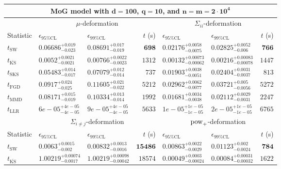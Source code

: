 \begin{tabular}{l|llr|llr}
	\toprule
	\multicolumn{7}{c}{{\bf MoG model with $\mathbf{d=100}$, $\mathbf{q=10}$, and $\mathbf{n=m=2\cdot 10^{4}}$}} \\
	\toprule
	\multicolumn{1}{c}{} & \multicolumn{3}{c}{$\mu$-deformation} & \multicolumn{3}{c}{$\Sigma_{ii}$-deformation} \\
	Statistic & $\epsilon_{95\%\mathrm{CL}}$ & $\epsilon_{99\%\mathrm{CL}}$ & $t$ (s) & $\epsilon_{95\%\mathrm{CL}}$ & $\epsilon_{99\%\mathrm{CL}}$ & $t$ (s) \\
	\midrule
	$t_{\mathrm{SW}}$ & $0.06686_{-0.023}^{+0.019}$ & $0.08691_{-0.019}^{+0.017}$ & ${\mathbf{698}}$ & $0.02176_{-0.0075}^{+0.0058}$ & $0.02825_{-0.006}^{+0.0052}$ & ${\mathbf{766}}$ \\
	$t_{\overline{\mathrm{KS}}}$ & ${\mathbf{0.0052_{-0.0021}^{+0.0021}}}$ & ${\mathbf{0.00766_{-0.0023}^{+0.0022}}}$ & $1312$ & ${\mathbf{0.00132_{-0.00062}^{+0.00073}}}$ & ${\mathbf{0.00216_{-0.00078}^{+0.00083}}}$ & $1447$ \\
	$t_{\mathrm{SKS}}$ & $0.05483_{-0.017}^{+0.014}$ & $0.07079_{-0.014}^{+0.012}$ & $737$ & $0.01903_{-0.0051}^{+0.0038}$ & $0.02404_{-0.0037}^{+0.0031}$ & $813$ \\
	$t_{\mathrm{FGD}}$ & $0.0917_{-0.025}^{+0.024}$ & $0.11605_{-0.022}^{+0.021}$ & $5212$ & $0.02962_{-0.0077}^{+0.0062}$ & $0.03721_{-0.0056}^{+0.005}$ & $5272$ \\
	$t_{\mathrm{MMD}}$ & $0.08171_{-0.019}^{+0.015}$ & $0.10334_{-0.014}^{+0.013}$ & $1992$ & $0.01681_{-0.0038}^{+0.0034}$ & $0.02112_{-0.0031}^{+0.0029}$ & $2247$ \\
	$t_{\mathrm{LLR}}$ & $6e-05_{-4e-05}^{+4e-05}$ & $9e-05_{-4e-05}^{+4e-05}$ & $5633$ & $1e-05_{-1e-05}^{+1e-05}$ & $2e-05_{-1e-05}^{+1e-05}$ & $6765$ \\
	\toprule
	\multicolumn{1}{c}{} & \multicolumn{3}{c}{$\Sigma_{i\neq j}$-deformation} & \multicolumn{3}{c}{$\rm{pow}_{+}$-deformation} \\
	Statistic & $\epsilon_{95\%\mathrm{CL}}$ & $\epsilon_{99\%\mathrm{CL}}$ & $t$ (s) & $\epsilon_{95\%\mathrm{CL}}$ & $\epsilon_{99\%\mathrm{CL}}$ & $t$ (s) \\
	\midrule
	$t_{\mathrm{SW}}$ & $0.0063_{-0.002}^{+0.0015}$ & $0.00832_{-0.0016}^{+0.0013}$ & ${\mathbf{15486}}$ & $0.00863_{-0.0029}^{+0.0022}$ & $0.01123_{-0.0024}^{+0.002}$ & ${\mathbf{784}}$ \\
	$t_{\overline{\mathrm{KS}}}$ & $1.00219_{-0.0017}^{+0.00074}$ & $1.00219_{-0.00042}^{+0.00098}$ & $18574$ & ${\mathbf{0.00049_{-0.00024}^{+0.0003}}}$ & ${\mathbf{0.00084_{-0.00032}^{+0.00031}}}$ & $1622$ \\

\end{tabular}
